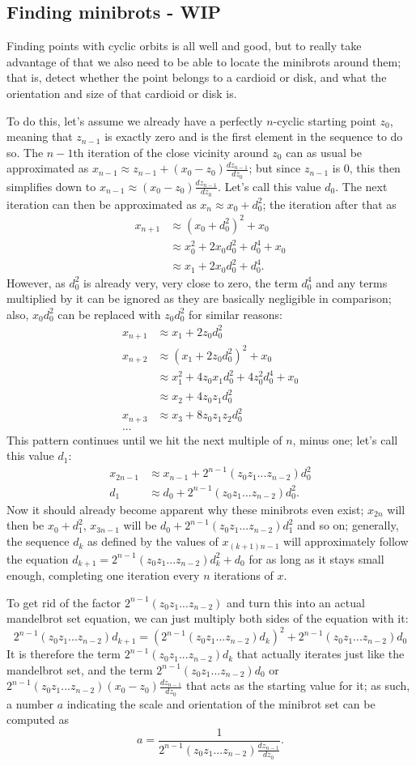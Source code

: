 \documentclass[12pt,a4paper]{article}
\newcommand{\eqar}[1]{\begin{align*} #1 \end{align*}}
\begin{document}
\subsection{Finding minibrots - WIP}

Finding points with cyclic orbits is all well and good, but to really take advantage of that we also need to be able to locate the minibrots around them; that is, detect whether the point belongs to a cardioid or disk, and what the orientation and size of that cardioid or disk is.

To do this, let's assume we already have a perfectly $n$-cyclic starting point $z_0$, meaning that $z_{n-1}$ is exactly zero and is the first element in the sequence to do so. The $n-1$th iteration of the close vicinity around $z_0$ can as usual be approximated as $x_{n-1}\approx z_{n-1}+(x_0-z_0)\frac{dz_{n-1}}{dz_0}$; but since $z_{n-1}$ is $0$, this then simplifies down to $x_{n-1}\approx(x_0-z_0)\frac{dz_{n-1}}{dz_0}$. Let's call this value $d_0$. The next iteration can then be approximated as $x_{n}\approx x_0+d_0^2$; the iteration after that as
\eqar{
	x_{n+1} &\approx (x_0+d_0^2)^2+x_0\\
	&\approx x_0^2+2x_0d_0^2+d_0^4+x_0\\
	&\approx x_1+2x_0d_0^2+d_0^4.
}
However, as $d_0^2$ is already very, very close to zero, the term $d_0^4$ and any terms multiplied by it can be ignored as they are basically negligible in comparison; also, $x_0d_0^2$ can be replaced with $z_0d_0^2$ for similar reasons:
\eqar{
	x_{n+1} &\approx x_1+2z_0d_0^2\\
	x_{n+2} &\approx (x_1+2z_0d_0^2)^2+x_0\\
	&\approx x_1^2+4z_0x_1d_0^2+4z_0^2d_0^4+x_0\\
	&\approx x_2+4z_0z_1d_0^2\\
	x_{n+3} &\approx x_3+8z_0z_1z_2d_0^2\\
	...
}
This pattern continues until we hit the next multiple of $n$, minus one; let's call this value $d_1$:
\eqar{
	x_{2n-1} &\approx x_{n-1}+2^{n-1}(z_0z_1...z_{n-2})d_0^2\\
	d_1 &\approx d_0+2^{n-1}(z_0z_1...z_{n-2})d_0^2.
}
Now it should already become apparent why these minibrots even exist; $x_{2n}$ will then be $x_0+d_1^2$, $x_{3n-1}$ will be $d_0+2^{n-1}(z_0z_1...z_{n-2})d_1^2$ and so on; generally, the sequence $d_k$ as defined by the values of $x_{(k+1)n-1}$ will approximately follow the equation $d_{k+1}=2^{n-1}(z_0z_1...z_{n-2})d_k^2+d_0$ for as long as it stays small enough, completing one iteration every $n$ iterations of $x$.

To get rid of the factor $2^{n-1}(z_0z_1...z_{n-2})$ and turn this into an actual mandelbrot set equation, we can just multiply both sides of the equation with it:
$$2^{n-1}(z_0z_1...z_{n-2})d_{k+1}=(2^{n-1}(z_0z_1...z_{n-2})d_k)^2+2^{n-1}(z_0z_1...z_{n-2})d_0$$
It is therefore the term $2^{n-1}(z_0z_1...z_{n-2})d_k$ that actually iterates just like the mandelbrot set, and the term $2^{n-1}(z_0z_1...z_{n-2})d_0$ or $2^{n-1}(z_0z_1...z_{n-2})(x_0-z_0)\frac{dz_{n-1}}{dz_0}$ that acts as the starting value for it; as such, a number $a$ indicating the scale and orientation of the minibrot set can be computed as $$a=\frac{1}{2^{n-1}(z_0z_1...z_{n-2})\frac{dz_{n-1}}{dz_0}}.$$
\end{document}
